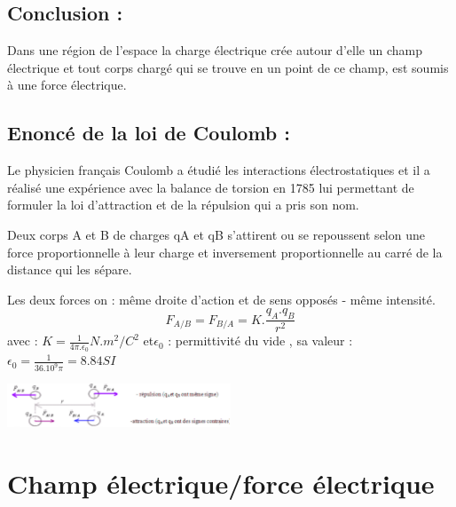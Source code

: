 \documentclass[12pt]{article}
\begin{document}
\subsection{Conclusion : }
Dans une région de l’espace la charge électrique crée autour d’elle un champ électrique et tout corps chargé qui se trouve en un
point de ce champ, est soumis à une force électrique.

\subsection{Enoncé de la loi de Coulomb :}
Le physicien français Coulomb a étudié les interactions électrostatiques et il a réalisé une expérience avec la balance de torsion en
1785 lui permettant de formuler la loi d’attraction et de la répulsion qui a pris son nom.

Deux corps A et B de charges qA et qB s'attirent ou se repoussent selon une force proportionnelle à leur charge et inversement
proportionnelle au carré de la distance qui les sépare.

Les deux forces on :  même droite d'action et de sens opposés - même intensité.
$$F_{A/B} = F_{B/A} = K.\frac{q_A.q_B}{r^2}$$
avec : $K = \frac{1}{4\pi.\epsilon_0} N.m^2/C^2$ et$ \epsilon_0$ : permittivité du vide , sa valeur : $\epsilon_0 = \frac{1}{36.10^9\pi}=8.84SI $
\begin{center}
    \includegraphics[width=0.5\textwidth]{./img/img_02.png}
\end{center}

\section{ Champ électrique/force électrique }
\end{document}
